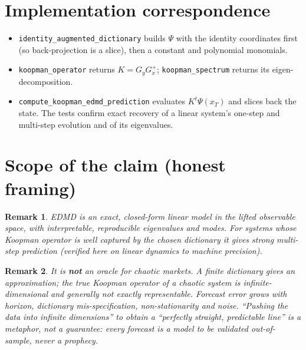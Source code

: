 \documentclass[11pt]{article}
\newtheorem{remark}{Remark}
\begin{document}
\section*{Implementation correspondence}

\begin{itemize}
\item \texttt{identity\_augmented\_dictionary} builds $\Psi$ with the identity
coordinates first (so back-projection is a slice), then a constant and polynomial
monomials.
\item \texttt{koopman\_operator} returns $K = G_y G_x^{+}$;
\texttt{koopman\_spectrum} returns its eigen-decomposition.
\item \texttt{compute\_koopman\_edmd\_prediction} evaluates $K^t \Psi(x_T)$ and
slices back the state. The tests confirm exact recovery of a linear system's
one-step and multi-step evolution and of its eigenvalues.
\end{itemize}

\section*{Scope of the claim (honest framing)}

\begin{remark}
EDMD is an exact, closed-form linear model \emph{in the lifted observable space},
with interpretable, reproducible eigenvalues and modes. For systems whose Koopman
operator is well captured by the chosen dictionary it gives strong multi-step
prediction (verified here on linear dynamics to machine precision).
\end{remark}

\begin{remark}
It is \textbf{not} an oracle for chaotic markets. A \emph{finite} dictionary gives
an \emph{approximation}; the true Koopman operator of a chaotic system is
infinite-dimensional and generally not exactly representable. Forecast error grows
with horizon, dictionary mis-specification, non-stationarity and noise. ``Pushing
the data into infinite dimensions'' to obtain a ``perfectly straight, predictable
line'' is a metaphor, not a guarantee: every forecast is a model to be validated
out-of-sample, never a prophecy.
\end{remark}
\end{document}
